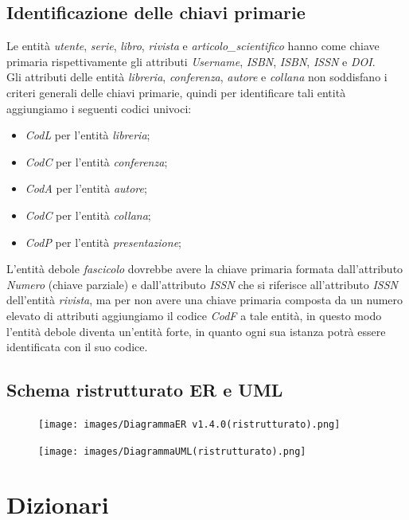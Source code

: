 \documentclass{article}
\begin{document}
\subsection{Identificazione delle chiavi primarie}
Le entità \textit{utente}, \textit{serie}, \textit{libro}, \textit{rivista} e \textit{articolo\_scientifico} hanno come chiave primaria rispettivamente gli attributi \textit{Username}, \textit{ISBN}, \textit{ISBN}, \textit{ISSN} e \textit{DOI}.\\
Gli attributi delle entità \textit{libreria}, \textit{conferenza}, \textit{autore} e \textit{collana} non soddisfano i criteri generali delle chiavi primarie, quindi per identificare tali entità aggiungiamo i seguenti codici univoci:
\begin{itemize} 
\item \textit{CodL} per l'entità \textit{libreria}; 
\item \textit{CodC} per l'entità \textit{conferenza}; 
\item \textit{CodA} per l'entità \textit{autore}; 
\item \textit{CodC} per l'entità \textit{collana};
\item \textit{CodP} per l'entità \textit{presentazione}; 
\end{itemize}
L'entità debole \textit{fascicolo} dovrebbe avere la chiave primaria formata dall'attributo \textit{Numero} (chiave parziale) e dall'attributo \textit{ISSN} che si riferisce all'attributo \textit{ISSN} dell'entità \textit{rivista}, ma per non avere una chiave primaria composta da un numero elevato di attributi aggiungiamo il codice \textit{CodF} a tale entità, in questo modo l'entità debole diventa un'entità forte, in quanto ogni sua istanza potrà essere identificata con il suo codice.

\newpage
\subsection{Schema ristrutturato ER e UML}

\begin{figure}[htp!]
    \texttt{[image: images/DiagrammaER v1.4.0(ristrutturato).png]}
\end{figure}
\begin{figure}[htp!]
    \texttt{[image: images/DiagrammaUML(ristrutturato).png]}
\end{figure}

\newpage
\section{Dizionari}
\end{document}
